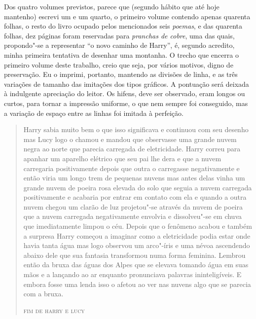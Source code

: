 Dos quatro volumes previstos, parece que (segundo hábito que até
hoje mantenho) escrevi um e um quarto, o primeiro volume contendo apenas
quarenta folhas, o resto do livro ocupado pelos mencionados seis
\textit{poemas}, e das quarenta folhas, dez páginas foram reservadas para
\textit{pranchas de cobre}, uma das quais, propondo"-se a representar ``o novo
caminho de Harry'', é, segundo acredito, minha primeira tentativa de
desenhar uma montanha. O trecho que encerra o primeiro volume deste
trabalho, creio que seja, por vários motivos, digno de preservação. Eu o
imprimi, portanto, mantendo as divisões de linha, e as três variações de
tamanho das imitações dos tipos gráficos. A pontuação será deixada à
indulgente apreciação do leitor. Os hifens, deve ser observado, eram
longos ou curtos, para tornar a impressão uniforme, o que nem sempre foi
conseguido, mas a variação de espaço entre as linhas foi imitada à
perfeição.
\medskip
\begin{quote}
Harry sabia muito bem o que isso significava e continuou com seu desenho mas Lucy logo o chamou e mandou que observasse uma grande nuvem negra ao norte que parecia carregada de eletricidade. Harry correu para apanhar um aparelho elétrico que seu pai lhe dera e que a nuvem carregaria positivamente depois que outra o carregasse negativamente e então viria um longo trem de pequenas nuvens mas antes delas vinha um grande nuvem de poeira rosa elevada do solo que seguia a nuvem carregada positivamente e acabaria por entrar em contato com ela e quando a outra nuvem chegou um clarão de luz projetou"-se através da nuvem de poeira que a nuvem carregada negativamente envolvia e dissolveu"-se em chuva que imediatamente limpou o céu.
Depois que o fenômeno acabou e também a surpresa Harry começou a
imaginar como a eletricidade podia estar onde havia tanta água mas logo
observou um arco"-íris e uma névoa ascendendo abaixo dele que sua
fantasia transformou numa forma feminina. Lembrou então da bruxa das
águas dos Alpes que se elevava tomando água em suas mãos e a lançando ao
ar enquanto pronunciava palavras ininteligíveis. E embora fosse uma
lenda isso o afetou ao ver nas nuvens algo que se parecia com a bruxa.
\smallskip
\begin{flushright}
\textsc{fim de harry e lucy}
\end{flushright}
\end{quote}

